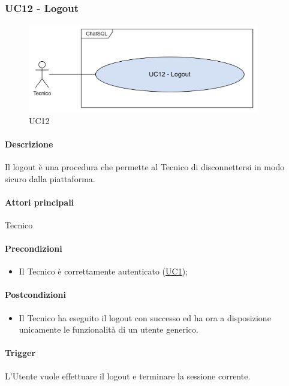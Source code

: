 \subsubsection{UC12 - Logout}\label{UC12}

\begin{figure}[H]
  \centering
  \includegraphics[width=0.90\textwidth]{assets/uc12.png}
  \caption{UC12}
\end{figure}

\paragraph*{Descrizione}
Il logout è una procedura che permette al Tecnico di disconnettersi in modo sicuro dalla piattaforma.

\paragraph*{Attori principali}
Tecnico

\paragraph*{Precondizioni}
\begin{itemize}
  \item Il Tecnico è correttamente autenticato (\hyperref[UC1]{UC1});
\end{itemize}

\paragraph*{Postcondizioni}
\begin{itemize}
  \item Il Tecnico ha eseguito il logout con successo ed ha ora a disposizione unicamente le funzionalità di un utente generico.
\end{itemize}

\paragraph*{Trigger}
L'Utente vuole effettuare il logout e terminare la sessione corrente.

